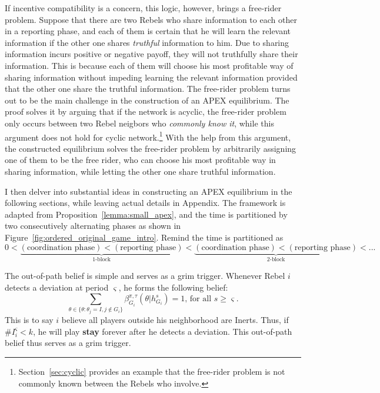 \documentclass[12pt,letter]{article}
\theoremstyle{definition}
\theoremstyle{remark}
\theoremstyle{claim}
\begin{document}
If incentive compatibility is a concern, this logic, however, brings a free-rider problem. Suppose that there are two Rebels who share information to each other in a reporting phase, and each of them is certain that he will learn the relevant information if the other one shares \textit{truthful} information to him. Due to sharing information incurs positive or negative payoff, they will not truthfully share their information. This is because each of them will choose his most profitable way of sharing information without impeding learning the relevant information provided that the other one share the truthful information. The free-rider problem turns out to be the main challenge in the construction of an APEX equilibrium. The proof solves it by arguing that if the network is acyclic, the free-rider problem only occurs between two Rebel neigbors who \textit{commonly know it}, while this argument does not hold for cyclic network.\footnote{Section~\ref{sec:cyclic} provides an example that the free-rider problem is not commonly known between the Rebels who involve.} 
With the help from this argument, the constructed equilibrium solves the free-rider problem by arbitrarily assigning one of them to be the {free rider}, who can choose his most profitable way in sharing information, while letting the other one share truthful information. 


I then delver into substantial ideas in constructing an APEX equilibrium in the following sections, while leaving actual details in Appendix. The framework is adapted from Proposition~\ref{lemma:small_apex}, and the time is partitioned by two consecutively alternating phases as shown in Figure~\ref{fig:ordered_original_game_intro}. Remind the time is partitioned as
\[0<\underbrace{(\text{coordination phase})<(\text{reporting phase})}_{\text{$1$-block}}<\underbrace{(\text{coordination phase})<(\text{reporting phase})}_{\text{$2$-block}}<...\]

The out-of-path belief is simple and serves as a grim trigger. Whenever Rebel $i$ detects a deviation at period $\varsigma$, he forms the following belief: 
\begin{equation}
\label{eq_grim_trigger}
\sum_{\theta \in \{\theta:\theta_j=I,j\notin G_i\}}\beta^{\pi,\tau}_{G_i}({\theta}|h^{s}_{G_i})=1 \text{, for all $s\geq \varsigma$}.
\end{equation}
This is to say $i$ believe all players outside his neighborhood are Inerts. Thus, if $\# I^{\varsigma}_i<k$, he will play \textbf{stay} forever after he detects a deviation. This out-of-path belief thus serves as a grim trigger. 
\end{document}
